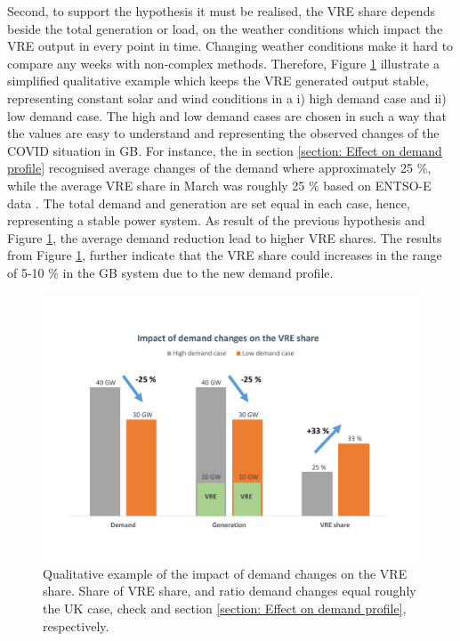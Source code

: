 \documentclass[energies,article,submit,moreauthors,pdftex]{Definitions/mdpi}
\begin{document}
Second, to support the hypothesis it must be realised, the VRE share depends beside the total generation or load, on the weather conditions which impact the VRE output in every point in time. Changing weather conditions make it hard to compare any weeks with non-complex methods. Therefore, Figure \ref{fig:generation_effects} illustrate a simplified qualitative example which keeps the VRE generated output stable, representing constant solar and wind conditions in a i) high demand case and ii) low demand case. The high and low demand cases are chosen in such a way that the values are easy to understand and representing the observed changes of the COVID situation in GB. For instance, the in section \ref{section: Effect on demand profile} recognised average changes of the demand where approximately 25 \%, while the average VRE share in March was roughly 25 \% based on ENTSO-E data \cite{ENTSO-E2020ENTSO-EPlatform}. The total demand and generation are set equal in each case, hence, representing a stable power system. As result of the previous hypothesis and Figure \ref{fig:generation_effects}, the average demand reduction lead to higher VRE shares. The results from Figure \ref{fig:generation_effects}, further indicate that the VRE share could increases in the range of 5-10 \% in the GB system due to the new demand profile.


\begin{figure}[H]
\centering
\hspace{-25pt}\includegraphics[trim={0cm 2cm 0cm 2cm},clip,width=1\textwidth]{Graphics/Illustrative-VRE-share-increase.pdf}
\caption{Qualitative example of the impact of demand changes on the VRE share. Share of VRE share, and ratio demand changes equal roughly the UK case, check \protect\cite{ENTSO-E2020ENTSO-EPlatform} and section \protect\ref{section: Effect on demand profile}, respectively.}
\label{fig:generation_effects}
\end{figure} 
\end{document}
